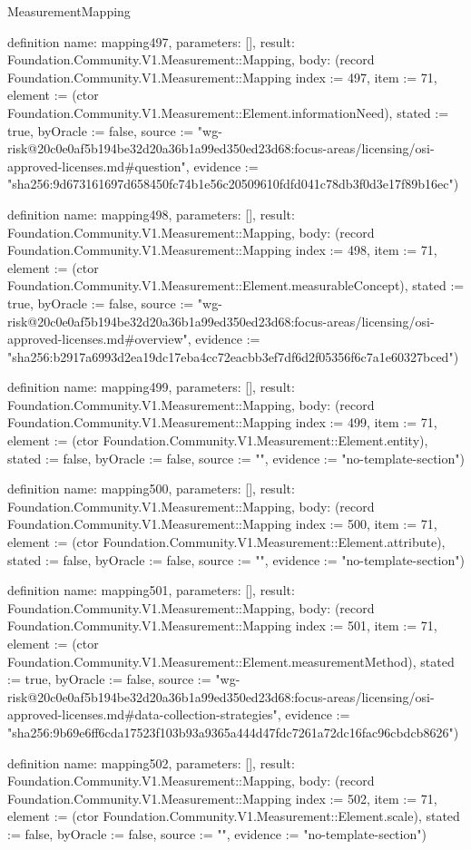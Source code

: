 \begin{lexlean}{MeasurementMapping}
\begin{semanticmodule}
definition{
  name: mapping497,
  parameters: [],
  result: Foundation.Community.V1.Measurement::Mapping,
  body: (record Foundation.Community.V1.Measurement::Mapping {index := 497, item := 71, element := (ctor Foundation.Community.V1.Measurement::Element.informationNeed), stated := true, byOracle := false, source := "wg-risk@20c0e0af5b194be32d20a36b1a99ed350ed23d68:focus-areas/licensing/osi-approved-licenses.md#question", evidence := "sha256:9d673161697d658450fc74b1e56c20509610fdfd041c78db3f0d3e17f89b16ec"})
}

definition{
  name: mapping498,
  parameters: [],
  result: Foundation.Community.V1.Measurement::Mapping,
  body: (record Foundation.Community.V1.Measurement::Mapping {index := 498, item := 71, element := (ctor Foundation.Community.V1.Measurement::Element.measurableConcept), stated := true, byOracle := false, source := "wg-risk@20c0e0af5b194be32d20a36b1a99ed350ed23d68:focus-areas/licensing/osi-approved-licenses.md#overview", evidence := "sha256:b2917a6993d2ea19dc17eba4cc72eacbb3ef7df6d2f05356f6c7a1e60327bced"})
}

definition{
  name: mapping499,
  parameters: [],
  result: Foundation.Community.V1.Measurement::Mapping,
  body: (record Foundation.Community.V1.Measurement::Mapping {index := 499, item := 71, element := (ctor Foundation.Community.V1.Measurement::Element.entity), stated := false, byOracle := false, source := "", evidence := "no-template-section"})
}

definition{
  name: mapping500,
  parameters: [],
  result: Foundation.Community.V1.Measurement::Mapping,
  body: (record Foundation.Community.V1.Measurement::Mapping {index := 500, item := 71, element := (ctor Foundation.Community.V1.Measurement::Element.attribute), stated := false, byOracle := false, source := "", evidence := "no-template-section"})
}

definition{
  name: mapping501,
  parameters: [],
  result: Foundation.Community.V1.Measurement::Mapping,
  body: (record Foundation.Community.V1.Measurement::Mapping {index := 501, item := 71, element := (ctor Foundation.Community.V1.Measurement::Element.measurementMethod), stated := true, byOracle := false, source := "wg-risk@20c0e0af5b194be32d20a36b1a99ed350ed23d68:focus-areas/licensing/osi-approved-licenses.md#data-collection-strategies", evidence := "sha256:9b69e6ff6cda17523f103b93a9365a444d47fdc7261a72dc16fac96cbdcb8626"})
}

definition{
  name: mapping502,
  parameters: [],
  result: Foundation.Community.V1.Measurement::Mapping,
  body: (record Foundation.Community.V1.Measurement::Mapping {index := 502, item := 71, element := (ctor Foundation.Community.V1.Measurement::Element.scale), stated := false, byOracle := false, source := "", evidence := "no-template-section"})
}


\end{semanticmodule}
\end{lexlean}
